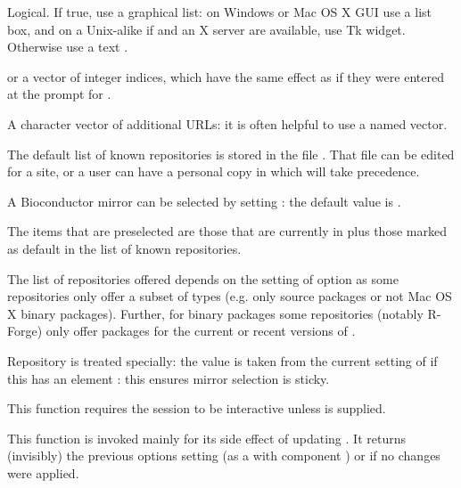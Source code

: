 %
\begin{Arguments}
\begin{ldescription}
\item[\code{graphics}] Logical. If true, use a graphical list: on Windows or
Mac OS X GUI use a list box, and on a Unix-alike if  and an X
server are available, use Tk widget. Otherwise use a text
.
\item[\code{ind}]  or a vector of integer indices, which have the
same effect as if they were entered at the prompt for
.
\item[\code{addURLs}] A character vector of additional URLs: it is often
helpful to use a named vector.
\end{ldescription}
\end{Arguments}
%
\begin{Details}\relax
The default list of known repositories is stored in the file
.
That file can be edited for a site, or a user can have a personal copy
in  which will take precedence.

A Bioconductor mirror can be selected by setting
: the default value is
.

The items that are preselected are those that are currently in
 plus those marked as default in the
list of known repositories.

The list of repositories offered depends on the setting of option
 as some repositories only offer a subset of types
(e.g. only source packages or not Mac OS X binary packages).
Further, for binary packages some repositories (notably R-Forge) only
offer packages for the current or recent versions of \R{}.

Repository  is treated specially: the value is taken from
the current setting of  if this has an
element : this ensures mirror selection is sticky.

This function requires the \R{} session to be interactive unless
 is supplied.
\end{Details}
%
\begin{Value}
This function is invoked mainly for its side effect of updating
.  It returns (invisibly) the previous
 options setting (as a  with component
) or  if no changes were applied.
\end{Value}
